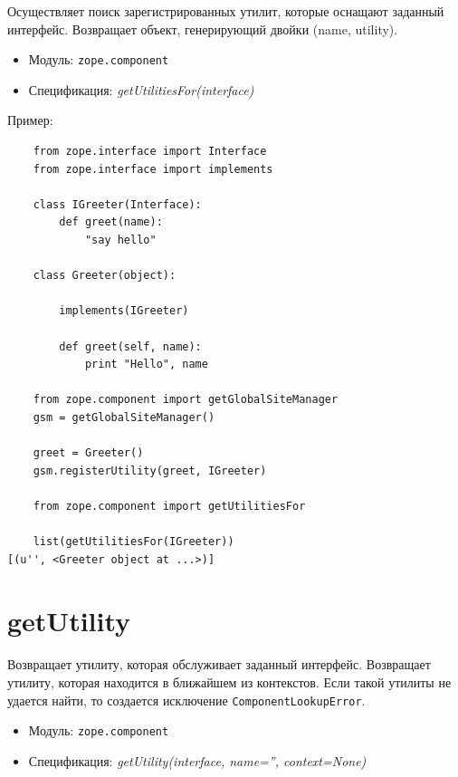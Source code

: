 \documentclass[a4paper,openany,twoside,draft]{book}
\providecommand*{\DUroletitlereference}[1]{\textsl{#1}}
\begin{document}
Осуществляет поиск зарегистрированных утилит, которые оснащают заданный интерфейс.  Возвращает объект, генерирующий двойки (name, utility).

\begin{itemize}

\item Модуль: \texttt{zope.component}

\item Спецификация: \DUroletitlereference{getUtilitiesFor(interface)}

\end{itemize}

Пример:

\begin{verbatim}
    from zope.interface import Interface
    from zope.interface import implements

    class IGreeter(Interface):
        def greet(name):
            "say hello"

    class Greeter(object):

        implements(IGreeter)

        def greet(self, name):
            print "Hello", name

    from zope.component import getGlobalSiteManager
    gsm = getGlobalSiteManager()

    greet = Greeter()
    gsm.registerUtility(greet, IGreeter)

    from zope.component import getUtilitiesFor

    list(getUtilitiesFor(IGreeter))
[(u'', <Greeter object at ...>)]
\end{verbatim}


\section*{getUtility%
  \label{getutility}%
}

Возвращает утилиту, которая обслуживает заданный интерфейс.  Возвращает утилиту, которая находится в ближайшем из контекстов.  Если такой утилиты не удается найти, то создается исключение \texttt{ComponentLookupError}.

\begin{itemize}

\item Модуль: \texttt{zope.component}

\item Спецификация: \DUroletitlereference{getUtility(interface, name='', context=None)}

\end{itemize}
\end{document}

